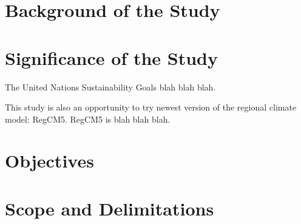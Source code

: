 \section{Background of the Study}

\section{Significance of the Study}
	The United Nations Sustainability Goals blah blah blah.
	
	This study is also an opportunity to try newest version of the regional climate model: RegCM5. RegCM5 is blah blah blah.

\section{Objectives}

\section{Scope and Delimitations}